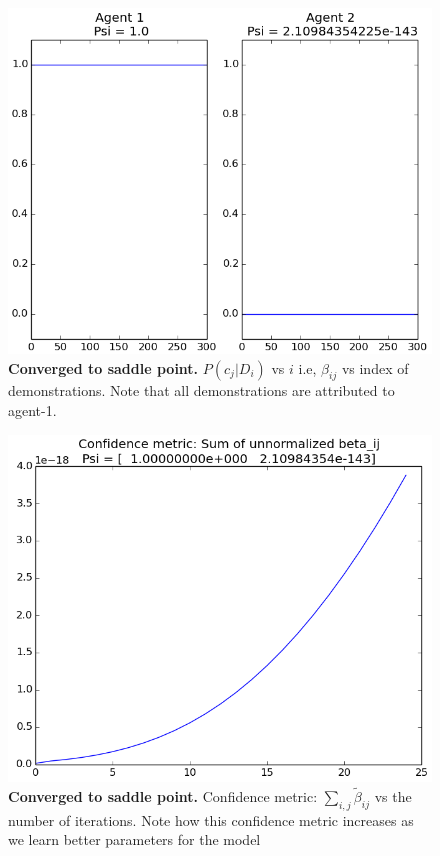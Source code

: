 \documentclass{article}[11pt]
\begin{document}
 \begin{figure}[H]
  \begin{center}
    \includegraphics[width=1\linewidth]{images/P(c|D)0}
    \caption{\textbf{Converged to saddle point.} $P(c_j|D_i)$ vs $i$ i.e, $\beta_{ij}$ vs index of demonstrations. Note that all demonstrations are attributed to agent-1.}
    \label{fig:5grid}
  \end{center}
\end{figure}

 \begin{figure}[H]
  \begin{center}
    \includegraphics[width=1\linewidth]{images/confidence0}
    \caption{\textbf{Converged to saddle point.} Confidence metric: $\sum_{i,j} \tilde{\beta}_{ij}$ vs the number of iterations. Note how this confidence metric increases as we learn better parameters for the model}
    \label{h_w}
  \end{center}
\end{figure}
\end{document}
